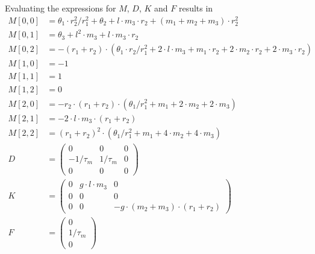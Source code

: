 \documentclass{article}
\begin{document}
Evaluating the expressions for $M$, $D$, $K$ and $F$ results in
\begin{align*}
M[0,0] &= \theta_1 \cdot r_2^2/r_1^2 + \theta_2 + l \cdot m_3 \cdot r_2 + (m_1 + m_2 + m_3) \cdot r_2^2  \\
M[0,1] &= \theta_3 + l^2 \cdot m_3 + l \cdot m_3 \cdot r_2  \\
M[0,2] &= -(r_1 + r_2) \cdot (\theta_1 \cdot r_2 /r_1^2 + 2 \cdot l \cdot m_3 + m_1 \cdot r_2 + 2 \cdot m_2 \cdot r_2 + 2 \cdot m_3 \cdot r_2)  \\
M[1,0] &= -1 \\
M[1,1] &= 1 \\
M[1,2] &= 0 \\
M[2,0] &= -r_2 \cdot (r_1 + r_2) \cdot (\theta_1/r_1^2  + m_1 + 2 \cdot m_2 + 2 \cdot m_3) \\
M[2,1] &= -2 \cdot l \cdot m_3 \cdot (r_1 + r_2) \\
M[2,2] &= (r_1 + r_2)^2 \cdot (\theta_1/r_1^2 + m_1 + 4 \cdot m_2 + 4 \cdot m_3) \\
D &= \left( {\begin{array}{ccc}
0 & 0 & 0 \\
-1/\tau_m & 1/\tau_m & 0 \\
0 & 0 & 0 \end{array} } \right) \\
K &= \left( {\begin{array}{ccc}
0 & g \cdot l \cdot m_3 & 0 \\
0 & 0 & 0 \\
0 & 0 & -g \cdot (m_2 + m_3) \cdot (r_1 + r_2)  \end{array} } \right) \\
F &= \left( {\begin{array}{c} 0 \\ 1/\tau_m \\ 0 \end{array} } \right)
\end{align*}
\end{document}
